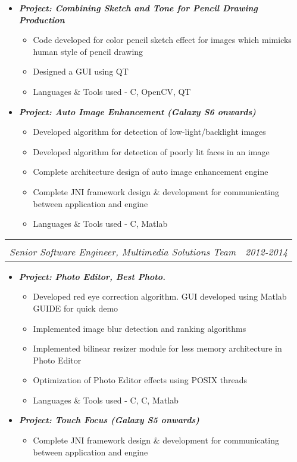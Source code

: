 \documentclass[letterpaper,11pt]{article}
\makeatletter
\def\CC{{C\nolinebreak[4]\hspace{-.05em}\raisebox{.4ex}{\tiny\bf ++}}}
\newcommand{\resitem}[1]{\item #1 \vspace{-2pt}}
\newcommand{\ressubheading}[4]{
	\begin{tabular*}{7.0in}{l@{\extracolsep{\fill}}r}
		\textbf{#1} & #2 \\
		\textit{#3} & \textit{#4} \\
	\end{tabular*}\vspace{-6pt}}
\makeatother
\begin{document}
\begin{itemize}
\begin{itemize}
				\vspace{1mm}
				\resitem[]{\faCircleO \hspace{1mm}\textbf{\emph{Project: Combining Sketch and Tone for Pencil Drawing Production}}}
				\begin{itemize}
						\resitem{Code developed for color pencil sketch effect for images which mimicks human style of pencil drawing}
						\resitem{Designed a GUI using QT}
						\resitem{Languages \& Tools used - \CC, OpenCV, QT}
				\end{itemize}
				\vspace{3mm}
				\resitem[]{\faCircleO \hspace{1mm}\textbf{\emph{Project: Auto Image Enhancement (Galaxy S6 onwards)}}}
				\begin{itemize}
						\resitem{Developed algorithm for detection of low-light/backlight images}
						\resitem{Developed algorithm for detection of poorly lit faces in an image}
						\resitem{Complete architecture design of auto image enhancement engine }
						\resitem{Complete JNI framework design \& development for communicating between application and engine}
						\resitem{Languages \& Tools used - C, Matlab}
				\end{itemize}
		\end{itemize}
		\ressubheading{}{}{Senior Software Engineer, Multimedia Solutions Team}{2012-2014}
		\begin{itemize}
				\resitem[]{\faCircleO \hspace{1mm}\textbf{\emph{Project: Photo Editor, Best Photo.}}}
				\begin{itemize}
						\resitem{Developed red eye correction algorithm. GUI developed using Matlab GUIDE for quick demo }
						\resitem{Implemented image blur detection and ranking algorithms}
						\resitem{Implemented bilinear resizer module for less memory architecture in Photo Editor}
						\resitem{Optimization of Photo Editor effects using POSIX threads}
						\resitem{Languages \& Tools used - C, \CC, Matlab}
				\end{itemize}
				\vspace{1mm}
				\resitem[]{\faCircleO \hspace{1mm}\textbf{\emph{Project: Touch Focus (Galaxy S5 onwards)}}}
				\begin{itemize}
						\resitem{Complete JNI framework design \& development for communicating between application and engine}
				\end{itemize}
		\end{itemize}

\end{itemize}
\end{document}

